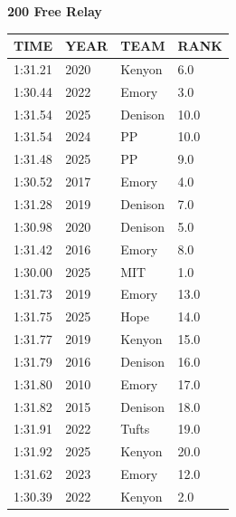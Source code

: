 \begin{table}[H]
\centering
\begin{minipage}[t]{0.6\textwidth}
\centering
\textbf{200 Free Relay}\\[0.1cm]
\begin{tabular}{@{}p{1.8cm}p{1.2cm}p{1.4cm}p{0.8cm}@{}}
\hline
    \textbf{TIME} & \textbf{YEAR} & \textbf{TEAM} & \textbf{RANK} \\
\hline
    1:31.21 & 2020 & Kenyon & 6.0 \\
    1:30.44 & 2022 & Emory & 3.0 \\
    1:31.54 & 2025 & Denison & 10.0 \\
    1:31.54 & 2024 & PP & 10.0 \\
    1:31.48 & 2025 & PP & 9.0 \\
    1:30.52 & 2017 & Emory & 4.0 \\
    1:31.28 & 2019 & Denison & 7.0 \\
    1:30.98 & 2020 & Denison & 5.0 \\
    1:31.42 & 2016 & Emory & 8.0 \\
    1:30.00 & 2025 & MIT & 1.0 \\
    1:31.73 & 2019 & Emory & 13.0 \\
    1:31.75 & 2025 & Hope & 14.0 \\
    1:31.77 & 2019 & Kenyon & 15.0 \\
    1:31.79 & 2016 & Denison & 16.0 \\
    1:31.80 & 2010 & Emory & 17.0 \\
    1:31.82 & 2015 & Denison & 18.0 \\
    1:31.91 & 2022 & Tufts & 19.0 \\
    1:31.92 & 2025 & Kenyon & 20.0 \\
    1:31.62 & 2023 & Emory & 12.0 \\
    1:30.39 & 2022 & Kenyon & 2.0 \\
\hline
\end{tabular}
\end{minipage}
\end{table}

